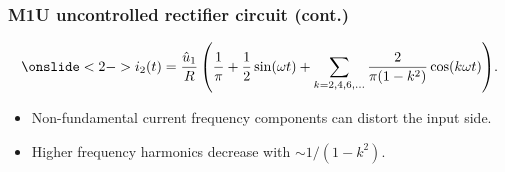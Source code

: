 \begin{frame}
    \frametitle{M1U uncontrolled rectifier circuit (cont.)}
    \begin{equation}
        \onslide<2->{i_2(t) = \frac{\hat{u}_1}{R}\left(\frac{1}{\pi} + \frac{1}{2}\sin(\omega t)+ \sum_{k=2,4,6,\ldots} \frac{2}{\pi(1-k^2)} \cos(k\omega t)\right)}.
    \end{equation}
    \begin{itemize}
        \item<3-> Non-fundamental current frequency components can distort the input side.
        \item<4-> Higher frequency harmonics decrease with $\sim 1/(1-k^2)$.
    \end{itemize}
\end{frame}

